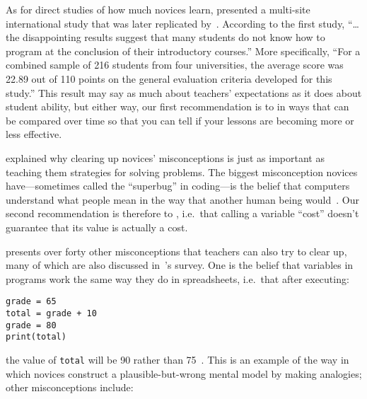 As for direct studies of how much novices learn,
\cite{McCr2001} presented a multi-site international study
that was later replicated by~\cite{Utti2013}.
According to the first study,
``{\ldots}the disappointing results suggest that
many students do not know how to program at the conclusion of their introductory courses.''
More specifically,
``For a combined sample of 216 students from four universities,
the average score was 22.89 out of 110 points on the general evaluation criteria developed for this study.''
This result may say as much about teachers' expectations as it does about student ability,
but either way,
our first recommendation is to 
in ways that can be compared over time
so that you can tell if your lessons are becoming more or less effective.


 explained why clearing up novices' misconceptions
is just as important as teaching them strategies for solving problems.
The biggest misconception novices have---sometimes called the ``superbug'' in coding---is
the belief that computers understand what people mean in the way that another human being would~\cite{Pea1986}.
Our second recommendation is therefore to ,
i.e.\ that calling a variable ``cost'' doesn't guarantee that its value is actually a cost.

\cite{Sorv2018} presents over forty other misconceptions that teachers can also try to clear up,
many of which are also discussed in~\cite{Qian2017}'s survey.
One is the belief that variables in programs work the same way they do in spreadsheets,
i.e.\ that after executing:

\begin{verbatim}
grade = 65
total = grade + 10
grade = 80
print(total)
\end{verbatim}

\noindent
the value of \texttt{total} will be 90 rather than 75~\cite{Kohn2017}.
This is an example of the way in which novices construct a plausible-but-wrong mental model by making analogies;
other misconceptions include:


